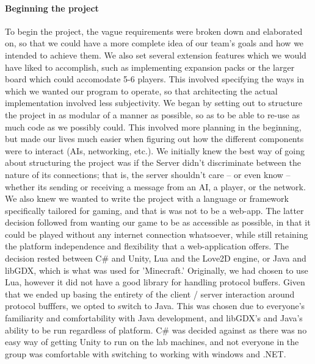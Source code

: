 \documentclass[a4paper,doc,draftfirst]{apa6}
\begin{document}
\paragraph{Beginning the project}
To begin the project, the vague requirements were broken down and elaborated on, so that we could have a more complete idea of our team's goals and how we intended to achieve them. We also set several extension features which we would have liked to accomplish, such as implementing expansion packs or the larger board which could accomodate 5-6 players. This involved specifying the ways in which we wanted our program to operate, so that architecting the actual implementation involved less subjectivity. We began by setting out to structure the project in as modular of a manner as possible, so as to be able to re-use as much code as we possibly could. This involved more planning in the beginning, but made our lives much easier when figuring out how the different components were to interact (AIs, networking, etc.). We initially knew the best way of going about structuring the project was if the Server didn't discriminate between the nature of its connections; that is, the server shouldn't care -- or even know -- whether its sending or receiving a message from an AI, a player, or the network. We also knew we wanted to write the project with a language or framework specifically tailored for gaming, and that is was not to be a web-app. The latter decision followed from wanting our game to be as accessible as possible, in that it could be played without any internet connection whatsoever, while still retaining the platform independence and flexibility that a web-application offers. The decision rested between C\# and Unity, Lua and the Love2D engine, or Java and libGDX, which is what was used for 'Minecraft.' Originally, we had chosen to use Lua, however it did not have a good library for handling protocol buffers. Given that we ended up basing the entirety of the client / server interaction around protocol bufffers, we opted to switch to Java. This was chosen due to everyone's familiarity and comfortability with Java development, and libGDX's and Java's ability to be run regardless of platform. C\# was decided against as there was no easy way of getting Unity to run on the lab machines, and not everyone in the group was comfortable with switching to working with windows and .NET. 
\end{document}
